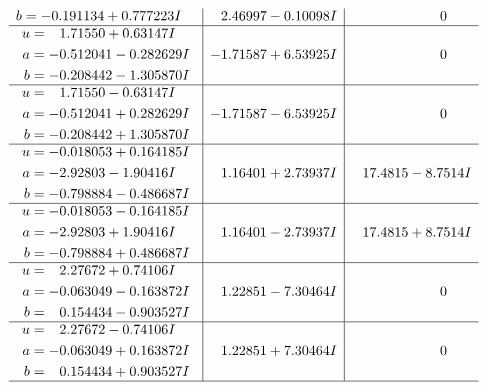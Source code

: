 \documentclass[1p]{elsarticle_modified}
\theoremstyle{definition}
\begin{document}
$$\begin{array}{c|c|c}
\begin{aligned}
b &= -0.191134 + 0.777223 I\end{aligned}
 & \phantom{-}2.46997 - 0.10098 I & \phantom{-0.000000 } 0 \\ \hline\begin{aligned}
u &= \phantom{-}1.71550 + 0.63147 I \\
a &= -0.512041 - 0.282629 I \\
b &= -0.208442 - 1.305870 I\end{aligned}
 & -1.71587 + 6.53925 I & \phantom{-0.000000 } 0 \\ \hline\begin{aligned}
u &= \phantom{-}1.71550 - 0.63147 I \\
a &= -0.512041 + 0.282629 I \\
b &= -0.208442 + 1.305870 I\end{aligned}
 & -1.71587 - 6.53925 I & \phantom{-0.000000 } 0 \\ \hline\begin{aligned}
u &= -0.018053 + 0.164185 I \\
a &= -2.92803 - 1.90416 I \\
b &= -0.798884 - 0.486687 I\end{aligned}
 & \phantom{-}1.16401 + 2.73937 I & \phantom{-}17.4815 - 8.7514 I \\ \hline\begin{aligned}
u &= -0.018053 - 0.164185 I \\
a &= -2.92803 + 1.90416 I \\
b &= -0.798884 + 0.486687 I\end{aligned}
 & \phantom{-}1.16401 - 2.73937 I & \phantom{-}17.4815 + 8.7514 I \\ \hline\begin{aligned}
u &= \phantom{-}2.27672 + 0.74106 I \\
a &= -0.063049 - 0.163872 I \\
b &= \phantom{-}0.154434 - 0.903527 I\end{aligned}
 & \phantom{-}1.22851 - 7.30464 I & \phantom{-0.000000 } 0 \\ \hline\begin{aligned}
u &= \phantom{-}2.27672 - 0.74106 I \\
a &= -0.063049 + 0.163872 I \\
b &= \phantom{-}0.154434 + 0.903527 I\end{aligned}
 & \phantom{-}1.22851 + 7.30464 I & \phantom{-0.000000 } 0\\
 \hline 
 \end{array}$$\newpage\newpage\renewcommand{\arraystretch}{1}
\end{document}
